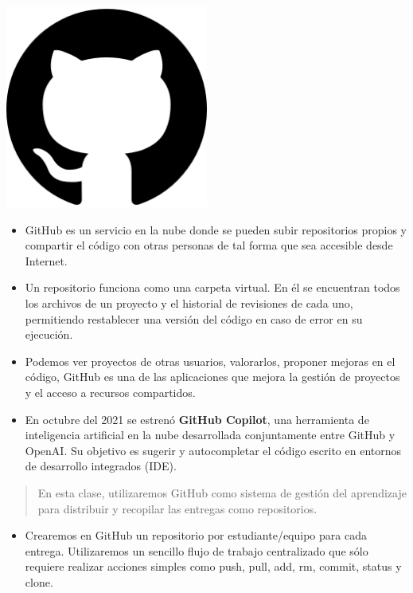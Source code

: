 \documentclass[
  letterpaper,
  DIV=11,
  numbers=noendperiod]{scrreprt}
\providecommand{\tightlist}{%
  \setlength{\itemsep}{0pt}\setlength{\parskip}{0pt}}\usepackage{longtable,booktabs,array}
\begin{document}
\begin{center}
\includegraphics[width=0.5\textwidth,height=\textheight]{Figuras/GitHub.png}
\end{center}

\begin{itemize}
\item
  GitHub es un servicio en la nube donde se pueden subir repositorios
  propios y compartir el código con otras personas de tal forma que sea
  accesible desde Internet.
\item
  Un repositorio funciona como una carpeta virtual. En él se encuentran
  todos los archivos de un proyecto y el historial de revisiones de cada
  uno, permitiendo restablecer una versión del código en caso de error
  en su ejecución.
\item
  Podemos ver proyectos de otras usuarios, valorarlos, proponer mejoras
  en el código, GitHub es una de las aplicaciones que mejora la gestión
  de proyectos y el acceso a recursos compartidos.
\item
  En octubre del 2021 se estrenó \textbf{GitHub Copilot}, una
  herramienta de inteligencia artificial en la nube desarrollada
  conjuntamente entre GitHub y OpenAI. Su objetivo es sugerir y
  autocompletar el código escrito en entornos de desarrollo integrados
  (IDE).
\end{itemize}

\begin{quote}
En esta clase, utilizaremos GitHub como sistema de gestión del
aprendizaje para distribuir y recopilar las entregas como repositorios.
\end{quote}

\begin{itemize}
\tightlist
\item
  Crearemos en GitHub un repositorio por estudiante/equipo para cada
  entrega. Utilizaremos un sencillo flujo de trabajo centralizado que
  sólo requiere realizar acciones simples como push, pull, add, rm,
  commit, status y clone.
\end{itemize}
\end{document}
